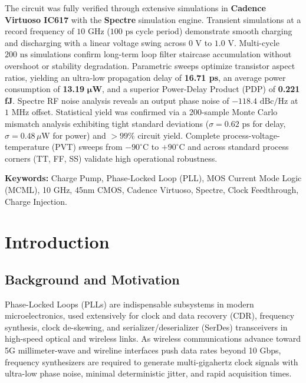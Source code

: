 \documentclass[11pt,a4paper]{report}
\begin{document}
The circuit was fully verified through extensive simulations in \textbf{Cadence Virtuoso IC617} with the \textbf{Spectre} simulation engine. Transient simulations at a record frequency of $10\text{ GHz}$ ($100\text{ ps}$ cycle period) demonstrate smooth charging and discharging with a linear voltage swing across $0\text{ V}$ to $1.0\text{ V}$. Multi-cycle $200\text{ ns}$ simulations confirm long-term loop filter staircase accumulation without overshoot or stability degradation. Parametric sweeps optimize transistor aspect ratios, yielding an ultra-low propagation delay of \textbf{16.71 ps}, an average power consumption of \textbf{13.19} $\boldsymbol{\mu}$\textbf{W}, and a superior Power-Delay Product (PDP) of \textbf{0.221 fJ}. Spectre RF noise analysis reveals an output phase noise of \textbf{$-118.4\text{ dBc/Hz}$} at $1\text{ MHz}$ offset. Statistical yield was confirmed via a 200-sample Monte Carlo mismatch analysis exhibiting tight standard deviations ($\sigma = 0.62\text{ ps}$ for delay, $\sigma = 0.48\,\mu\text{W}$ for power) and $>99\%$ circuit yield. Complete process-voltage-temperature (PVT) sweeps from $-90^\circ\text{C}$ to $+90^\circ\text{C}$ and across standard process corners (TT, FF, SS) validate high operational robustness.

\vspace{0.8cm}
\noindent \textbf{Keywords:} Charge Pump, Phase-Locked Loop (PLL), MOS Current Mode Logic (MCML), 10 GHz, 45nm CMOS, Cadence Virtuoso, Spectre, Clock Feedthrough, Charge Injection.

\newpage

\tableofcontents
\newpage
\listoffigures
\newpage
\listoftables
\newpage

\setcounter{page}{1}

\chapter{Introduction}

\section{Background and Motivation}
Phase-Locked Loops (PLLs) are indispensable subsystems in modern microelectronics, used extensively for clock and data recovery (CDR), frequency synthesis, clock de-skewing, and serializer/deserializer (SerDes) transceivers in high-speed optical and wireless links. As wireless communications advance toward 5G millimeter-wave and wireline interfaces push data rates beyond 10 Gbps, frequency synthesizers are required to generate multi-gigahertz clock signals with ultra-low phase noise, minimal deterministic jitter, and rapid acquisition times.
\end{document}
